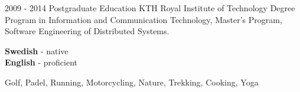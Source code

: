 \documentclass[9pt]{template} %
\begin{document}

\begin{entrylist}
  \entry
    {2009 - 2014}
    {Postgraduate Education}
    {KTH Royal Institute of Technology}
    {Degree Program in Information and Communication Technology, Master's
      Program, Software Engineering of Distributed Systems.}
\end{entrylist}


\begin{minipage}[t]{0.3\textwidth}
  \vspace{-\baselineskip} %


  \textbf{Swedish} - native\\
  \textbf{English} - proficient
\end{minipage}
\hfill
\begin{minipage}[t]{0.7\textwidth}
  \vspace{-\baselineskip} %


  Golf, Padel, Running, Motorcycling, Nature, Trekking, Cooking, Yoga
\end{minipage}


\end{document}
